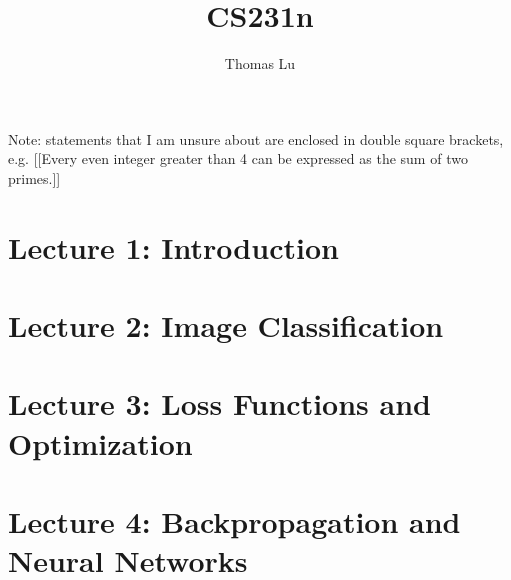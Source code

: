 \documentclass{article}
\title{CS231n}
\author{Thomas Lu}
\date{}
\begin{document}
\maketitle
Note: statements that I am unsure about are enclosed in double square brackets, e.g. [[Every even integer greater than 4 can be expressed as the sum of two primes.]]
\section{Lecture 1: Introduction}

\section{Lecture 2: Image Classification}

\section{Lecture 3: Loss Functions and Optimization}

\section{Lecture 4: Backpropagation and Neural Networks}

\end{document}

